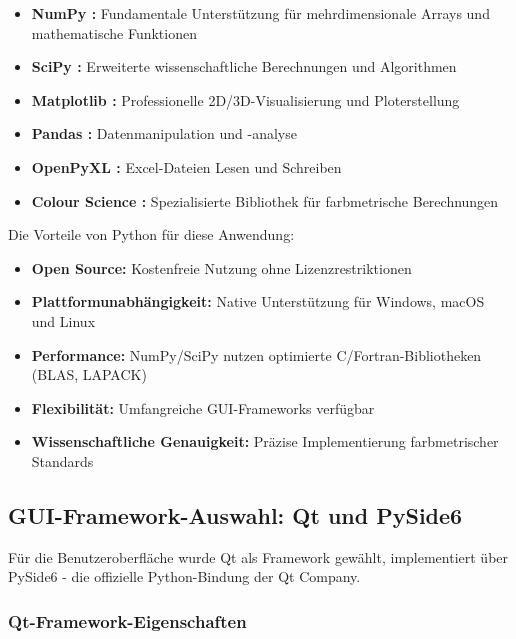 \begin{itemize}
    \item \textbf{NumPy \parencite{NumPy}:} Fundamentale Unterstützung für mehrdimensionale Arrays und mathematische Funktionen
    \item \textbf{SciPy \parencite{SciPy}:} Erweiterte wissenschaftliche Berechnungen und Algorithmen
    \item \textbf{Matplotlib \parencite{Matplotlib}:} Professionelle 2D/3D-Visualisierung und Ploterstellung
    \item \textbf{Pandas \parencite{Pandas}:} Datenmanipulation und -analyse
    \item \textbf{OpenPyXL \parencite{OpenPyXL}:} Excel-Dateien Lesen und Schreiben
    \item \textbf{Colour Science \parencite{ColourScience}:} Spezialisierte Bibliothek für farbmetrische Berechnungen
\end{itemize}

Die Vorteile von Python für diese Anwendung:

\begin{itemize}
    \item \textbf{Open Source:} Kostenfreie Nutzung ohne Lizenzrestriktionen
    \item \textbf{Plattformunabhängigkeit:} Native Unterstützung für Windows, macOS und Linux
    \item \textbf{Performance:} NumPy/SciPy \parencite{NumPy, SciPy} nutzen optimierte C/Fortran-Bibliotheken (BLAS, LAPACK)
    \item \textbf{Flexibilität:} Umfangreiche GUI-Frameworks verfügbar
    \item \textbf{Wissenschaftliche Genauigkeit:} Präzise Implementierung farbmetrischer Standards
\end{itemize}

\subsection{GUI-Framework-Auswahl: Qt und PySide6}

Für die Benutzeroberfläche wurde Qt \parencite{Qt6} als Framework gewählt, implementiert über PySide6 \parencite{PySide6} - die offizielle Python-Bindung der Qt Company.

\subsubsection{Qt-Framework-Eigenschaften}

